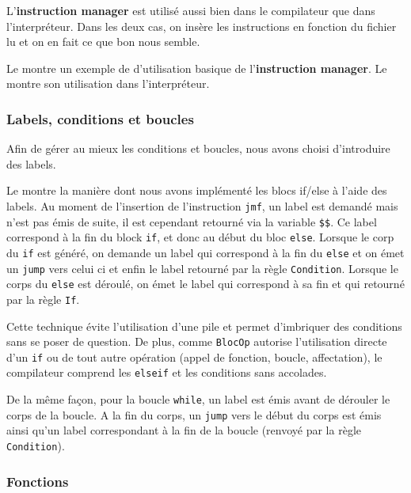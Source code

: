     L'\textbf{instruction manager} est utilisé aussi bien dans le compilateur que dans l'interpréteur. Dans les deux cas, on insère les instructions en fonction du fichier lu et on en fait ce que bon nous semble.

    Le  montre un exemple de d'utilisation basique de l'\textbf{instruction manager}. Le  montre son utilisation dans l'interpréteur.


    \subsubsection{Labels, conditions et boucles}

    Afin de gérer au mieux les conditions et boucles, nous avons choisi d'introduire des labels.
    
    Le  montre la manière dont nous avons implémenté les blocs if/else à l'aide des labels. Au moment de l'insertion de l'instruction \texttt{jmf}, un label est demandé mais n'est pas émis de suite, il est cependant retourné via la variable \texttt{\$\$}. Ce label correspond à la fin du block \texttt{if}, et donc au début du bloc \texttt{else}. Lorsque le corp du \texttt{if} est généré, on demande un label qui correspond à la fin du \texttt{else} et on émet un \texttt{jump} vers celui ci et enfin le label retourné par la règle \texttt{Condition}. Lorsque le corps du \texttt{else} est déroulé, on émet le label qui correspond à sa fin et qui retourné par la règle \texttt{If}.
    
    Cette technique évite l'utilisation d'une pile et permet d'imbriquer des conditions sans se poser de question. De plus, comme \texttt{BlocOp} autorise l'utilisation directe d'un \texttt{if} ou de tout autre opération (appel de fonction, boucle, affectation), le compilateur comprend les \texttt{elseif} et les conditions sans accolades.

    De la même façon, pour la boucle \texttt{while}, un label est émis avant de dérouler le corps de la boucle. A la fin du corps, un \texttt{jump} vers le début du corps est émis ainsi qu'un label correspondant à la fin de la boucle (renvoyé par la règle \texttt{Condition}).

    \subsubsection{Fonctions}

